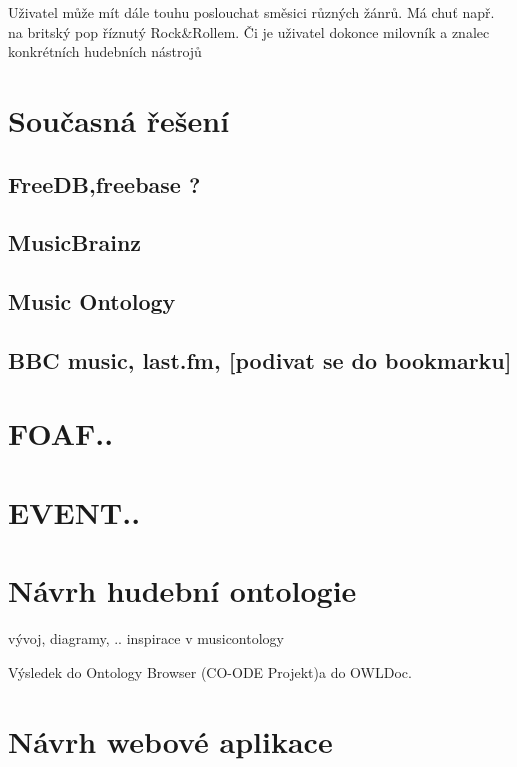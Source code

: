 Uživatel může mít dále touhu poslouchat směsici různých žánrů. Má chuť např. na britský pop říznutý Rock&Rollem.
Či je uživatel dokonce milovník a znalec konkrétních hudebních nástrojů

\section{Současná řešení}

    \subsection{FreeDB,freebase ?}
    
    \subsection{MusicBrainz}
    
    \subsection{Music Ontology}

    \subsection{BBC music, last.fm, [podivat se do bookmarku]}


\section{FOAF..}


\section{EVENT..}

\section{Návrh hudební ontologie}


vývoj, diagramy, ..
inspirace v musicontology


Výsledek do Ontology Browser (CO-ODE Projekt)a do OWLDoc.

\section{Návrh webové aplikace}